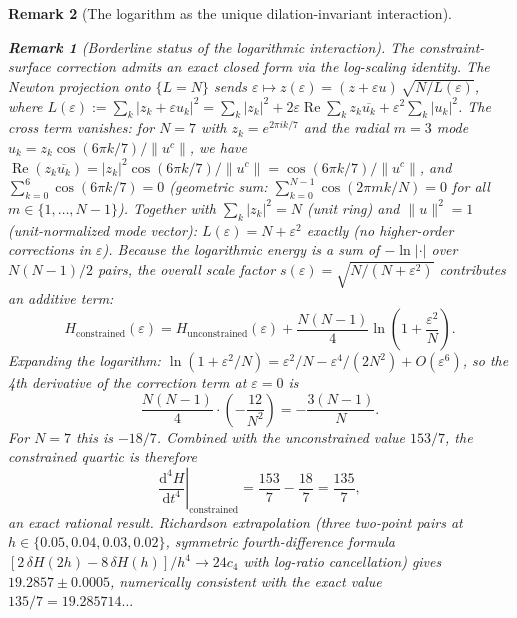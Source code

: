 \documentclass[12pt, a4paper]{article}
\newtheorem{remark}{Remark}[section]
\numberwithin{equation}{section}
\newcommand{\dd}{\mathrm{d}}
\begin{document}
\begin{remark}[The logarithm as the unique dilation-invariant interaction]
\begin{remark}[Borderline status of the logarithmic interaction]
The constraint-surface correction admits an exact closed form via
the \emph{log-scaling identity}.  The Newton projection onto
$\{L = N\}$ sends $\varepsilon \mapsto
z(\varepsilon) = (z + \varepsilon u)\,\sqrt{N/L(\varepsilon)}$, where
$L(\varepsilon) := \sum_k |z_k + \varepsilon u_k|^2
= \sum_k|z_k|^2 + 2\varepsilon \operatorname{Re}\sum_k z_k\overline{u_k}
+ \varepsilon^2 \sum_k|u_k|^2$.
The cross term vanishes: for $N = 7$ with $z_k = e^{2\pi ik/7}$ and
the radial $m = 3$ mode $u_k = z_k\cos(6\pi k/7)/\|u^c\|$, we have
$\operatorname{Re}(z_k\overline{u_k})
= |z_k|^2\cos(6\pi k/7)/\|u^c\|
= \cos(6\pi k/7)/\|u^c\|$,
and $\sum_{k=0}^{6}\cos(6\pi k/7) = 0$
(geometric sum: $\sum_{k=0}^{N-1}\cos(2\pi mk/N) = 0$ for all
$m \in \{1, \ldots, N{-}1\}$).
Together with $\sum_k|z_k|^2 = N$ (unit ring) and $\|u\|^2 = 1$
(unit-normalized mode vector): $L(\varepsilon) = N + \varepsilon^2$
\emph{exactly} (no higher-order corrections in $\varepsilon$).  Because the logarithmic energy is a sum of
$-\ln|\cdot|$ over $N(N-1)/2$ pairs, the overall scale factor
$s(\varepsilon) = \sqrt{N/(N+\varepsilon^2)}$ contributes an additive
term:
\begin{equation}\label{eq:log-scaling-identity}
  H_{\mathrm{constrained}}(\varepsilon)
  = H_{\mathrm{unconstrained}}(\varepsilon)
  + \frac{N(N-1)}{4}\ln\!\left(1 + \frac{\varepsilon^2}{N}\right).
\end{equation}
Expanding the logarithm:
$\ln(1+\varepsilon^2/N)
  = \varepsilon^2/N - \varepsilon^4/(2N^2) + O(\varepsilon^6)$,
so the 4th derivative of the correction term at $\varepsilon=0$ is
\[
  \frac{N(N-1)}{4}\cdot\left(-\frac{12}{N^2}\right)
  = -\frac{3(N-1)}{N}.
\]
For $N=7$ this is $-18/7$.  Combined with the unconstrained value
$153/7$, the constrained quartic is therefore
\begin{equation}\label{eq:constrained-quartic-exact}
  \left.\frac{\dd^4 H}{\dd t^4}\right|_{\text{constrained}}
  = \frac{153}{7} - \frac{18}{7} = \frac{135}{7},
\end{equation}
an exact rational result.  Richardson extrapolation (three two-point
pairs at $h \in \{0.05,0.04,0.03,0.02\}$, symmetric fourth-difference
formula $[2\,\delta\!H(2h)-8\,\delta\!H(h)]/h^4\to 24c_4$ with
log-ratio cancellation) gives $19.2857\pm 0.0005$, numerically
consistent with the exact value $135/7 = 19.285714\ldots$


\end{remark}
\end{remark}
\end{document}
